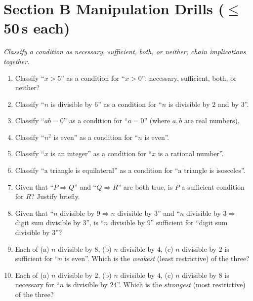 \documentclass[11pt,a4paper]{article}
\begin{document}
\section*{Section B \quad Manipulation Drills \hfill{\normalfont\small($\leq$50\,s each)}}

\noindent\textit{Classify a condition as necessary, sufficient, both, or neither; chain implications together.}

\begin{enumerate}

\item Classify ``$x>5$'' as a condition for ``$x>0$'': necessary, sufficient, both, or neither?

\item Classify ``$n$ is divisible by $6$'' as a condition for ``$n$ is divisible by $2$ and by $3$''.

\item Classify ``$ab=0$'' as a condition for ``$a=0$'' (where $a,b$ are real numbers).

\item Classify ``$n^2$ is even'' as a condition for ``$n$ is even''.

\item Classify ``$x$ is an integer'' as a condition for ``$x$ is a rational number''.

\item Classify ``a triangle is equilateral'' as a condition for ``a triangle is isosceles''.

\item Given that ``$P \Rightarrow Q$'' and ``$Q \Rightarrow R$'' are both true, is $P$ a sufficient condition for $R$? Justify briefly.

\item Given that ``$n$ divisible by $9 \Rightarrow n$ divisible by $3$'' and ``$n$ divisible by $3 \Rightarrow$ digit sum divisible by $3$'', is ``$n$ divisible by $9$'' sufficient for ``digit sum divisible by $3$''?

\item Each of (a) $n$ divisible by $8$, (b) $n$ divisible by $4$, (c) $n$ divisible by $2$ is sufficient for ``$n$ is even''. Which is the \emph{weakest} (least restrictive) of the three?

\item Each of (a) $n$ divisible by $2$, (b) $n$ divisible by $4$, (c) $n$ divisible by $8$ is necessary for ``$n$ is divisible by $24$''. Which is the \emph{strongest} (most restrictive) of the three?

\end{enumerate}
\end{document}
